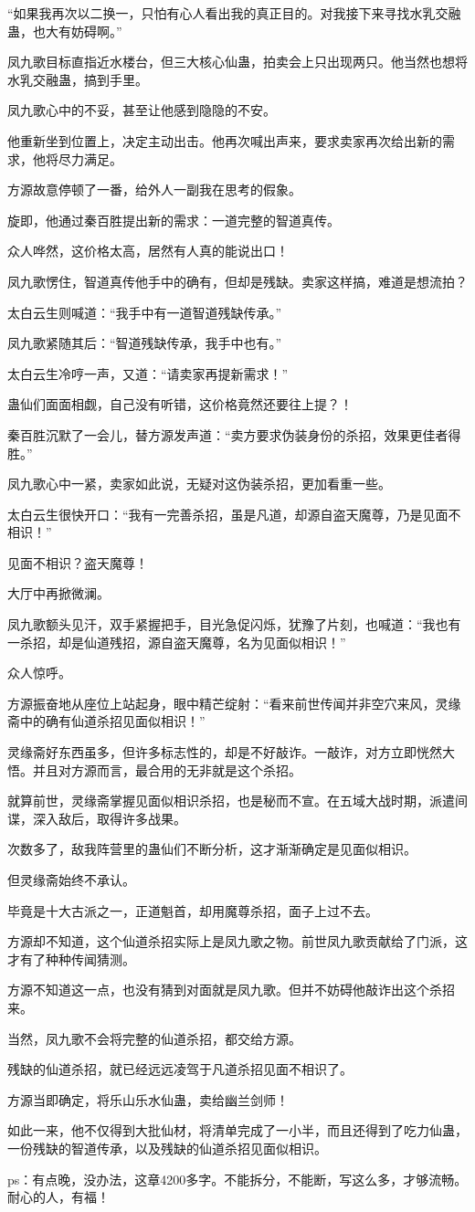 \begin{this_body}
“如果我再次以二换一，只怕有心人看出我的真正目的。对我接下来寻找水乳交融蛊，也大有妨碍啊。”

凤九歌目标直指近水楼台，但三大核心仙蛊，拍卖会上只出现两只。他当然也想将水乳交融蛊，搞到手里。

凤九歌心中的不妥，甚至让他感到隐隐的不安。

他重新坐到位置上，决定主动出击。他再次喊出声来，要求卖家再次给出新的需求，他将尽力满足。

方源故意停顿了一番，给外人一副我在思考的假象。

旋即，他通过秦百胜提出新的需求：一道完整的智道真传。

众人哗然，这价格太高，居然有人真的能说出口！

凤九歌愣住，智道真传他手中的确有，但却是残缺。卖家这样搞，难道是想流拍？

太白云生则喊道：“我手中有一道智道残缺传承。”

凤九歌紧随其后：“智道残缺传承，我手中也有。”

太白云生冷哼一声，又道：“请卖家再提新需求！”

蛊仙们面面相觑，自己没有听错，这价格竟然还要往上提？！

秦百胜沉默了一会儿，替方源发声道：“卖方要求伪装身份的杀招，效果更佳者得胜。”

凤九歌心中一紧，卖家如此说，无疑对这伪装杀招，更加看重一些。

太白云生很快开口：“我有一完善杀招，虽是凡道，却源自盗天魔尊，乃是见面不相识！”

见面不相识？盗天魔尊！

大厅中再掀微澜。

凤九歌额头见汗，双手紧握把手，目光急促闪烁，犹豫了片刻，也喊道：“我也有一杀招，却是仙道残招，源自盗天魔尊，名为见面似相识！”

众人惊呼。

方源振奋地从座位上站起身，眼中精芒绽射：“看来前世传闻并非空穴来风，灵缘斋中的确有仙道杀招见面似相识！”

灵缘斋好东西虽多，但许多标志性的，却是不好敲诈。一敲诈，对方立即恍然大悟。并且对方源而言，最合用的无非就是这个杀招。

就算前世，灵缘斋掌握见面似相识杀招，也是秘而不宣。在五域大战时期，派遣间谍，深入敌后，取得许多战果。

次数多了，敌我阵营里的蛊仙们不断分析，这才渐渐确定是见面似相识。

但灵缘斋始终不承认。

毕竟是十大古派之一，正道魁首，却用魔尊杀招，面子上过不去。

方源却不知道，这个仙道杀招实际上是凤九歌之物。前世凤九歌贡献给了门派，这才有了种种传闻猜测。

方源不知道这一点，也没有猜到对面就是凤九歌。但并不妨碍他敲诈出这个杀招来。

当然，凤九歌不会将完整的仙道杀招，都交给方源。

残缺的仙道杀招，就已经远远凌驾于凡道杀招见面不相识了。

方源当即确定，将乐山乐水仙蛊，卖给幽兰剑师！

如此一来，他不仅得到大批仙材，将清单完成了一小半，而且还得到了吃力仙蛊，一份残缺的智道传承，以及残缺的仙道杀招见面似相识。

ps：有点晚，没办法，这章4200多字。不能拆分，不能断，写这么多，才够流畅。耐心的人，有福！

\end{this_body}

